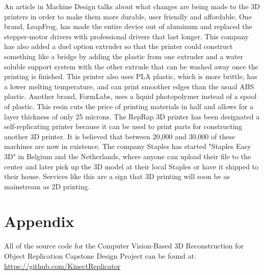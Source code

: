 \documentclass[12pt,twocolumn]{article}
\begin{document}
\indent	An article in Machine Design talks about what changes are being made to the 3D printers in order to make them more durable, user friendly and affordable. One brand, LeapFrog, has made the entire device out of aluminum and  replaced the stepper-motor drivers with professional drivers that last longer. This company has also added a duel option extruder so that the printer could construct something like a bridge by adding the plastic from one extruder and a water soluble support system with the other extrude that can be washed away once the printing is finished. This printer also uses PLA plastic, which is more brittle, has a lower melting temperature, and can print smoother edges than the usual ABS plastic. Another brand, FormLabs, uses a liquid photopolymer instead of a spool of plastic. This resin cuts the price of printing materials in half and allows for a layer thickness of only 25 microns. The RepRap 3D printer has been designated a self-replicating printer because it can be used to print parts for constructing another 3D printer. It is believed that between 20,000 and 30,000 of these machines are now in existence.\cite{cite7} The company Staples has started "Staples Easy 3D" in Belgium and the Netherlands, where anyone can upload their file to the center and later pick up the 3D model at their local Staples or have it shipped to their house. Services like this are a sign that 3D printing will soon be as mainstream as 2D printing. 


\section{}


\section{Appendix} 
All of the source code for the Computer Vision-Based 3D Reconstruction for Object Replication Capstone Design Project can be found at: \url{https://github.com/KinectReplicator}
\end{document}
